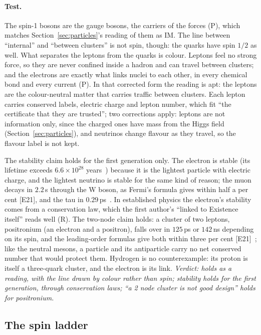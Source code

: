 \documentclass[11pt,a4paper]{article}
\theoremstyle{definition}
\theoremstyle{remark}
\newcommand{\chk}[1]{\textsf{[#1]}}
\newcommand{\tagR}{\textsf{(R)}}
\newcommand{\tagP}{\textsf{(P)}}
\begin{document}
\paragraph{Test.} The spin-1 bosons are the gauge bosons, the carriers of the forces \tagP, which matches Section~\ref{sec:particles}'s
reading of them as IM. The line between ``internal'' and ``between clusters'' is not spin, though: the quarks have spin $1/2$ as well. What
separates the leptons from the quarks is colour. Leptons feel no strong force, so they are never confined inside a hadron and can travel
between clusters; and the electrons are exactly what links nuclei to each other, in every chemical bond and every current \tagP. In that
corrected form the reading is apt: the leptons are the colour-neutral matter that carries traffic between clusters. Each lepton carries
conserved labels, electric charge and lepton number, which fit ``the certificate that they are trusted''; two corrections apply: leptons
are not information only, since the charged ones have mass from the Higgs field (Section~\ref{sec:particles}), and neutrinos change flavour
as they travel, so the flavour label is not kept.

The stability claim holds for the first generation only. The electron is stable (its lifetime exceeds $6.6\times10^{28}$ years~\cite{borexino})
because it is the lightest particle with electric charge, and the lightest neutrino is stable for the same kind of reason; the muon decays in
$2.2$\,\textmu s through the W boson, as Fermi's formula gives within half a per cent \chk{E21}, and the tau in $0.29$\,ps~\cite{pdg}. In
established physics the electron's stability comes from a conservation law, which the first author's ``linked to Existence itself'' reads
well \tagR. The two-node claim holds: a cluster of two leptons, positronium (an electron and a positron), falls over in $125$\,ps or
$142$\,ns depending on its spin, and the leading-order formulas give both within three per cent \chk{E21}~\cite{orepowell}; like the neutral
mesons, a particle and its antiparticle carry no net conserved number that would protect them. Hydrogen is no counterexample: its proton is
itself a three-quark cluster, and the electron is its link. \emph{Verdict: holds as a reading, with the line drawn by colour rather than
spin; stability holds for the first generation, through conservation laws; ``a 2 node cluster is not good design'' holds for positronium.}

\subsection{The spin ladder}
\end{document}
